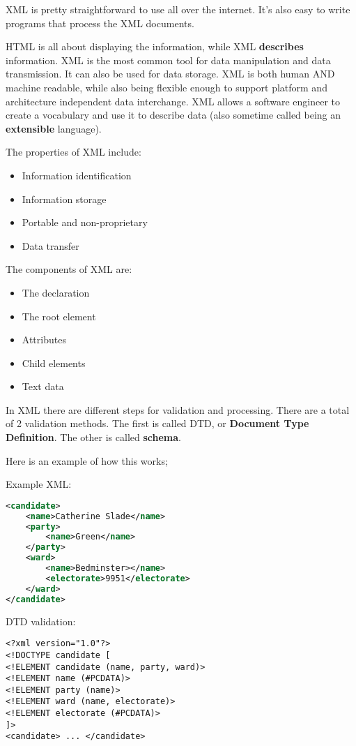 \documentclass[11pt,a4paper,titlepage,dvipsnames,cmyk]{scrartcl}
\begin{document}
XML is pretty straightforward to use all over the internet. It's also easy
to write programs that process the XML documents.

HTML is all about displaying the information, while XML \textbf{describes}
information. XML is the most common tool for data manipulation and data
transmission. It can also be used for data storage. XML is both human AND
machine readable, while also being flexible enough to support platform and
architecture independent data interchange. XML allows a software engineer
to create a vocabulary and use it to describe data (also sometime called
being an \textbf{extensible} language).

The properties of XML include:
\begin{itemize}
    \item Information identification
    \item Information storage
    \item Portable and non-proprietary
    \item Data transfer
\end{itemize}

The components of XML are:

\begin{itemize}
    \item The declaration
    \item The root element
    \item Attributes
    \item Child elements
    \item Text data
\end{itemize}

In XML there are different steps for validation and processing. There are
a total of 2 validation methods. The first is called DTD, or
\textbf{Document Type Definition}. The other is called \textbf{schema}.

Here is an example of how this works;

Example XML:
\begin{lstlisting}[language=XML]
<candidate>
    <name>Catherine Slade</name>
    <party>
        <name>Green</name>
    </party>
    <ward>
        <name>Bedminster></name>
        <electorate>9951</electorate>
    </ward>
</candidate>
\end{lstlisting}

DTD validation:
\begin{lstlisting}[]
<?xml version="1.0"?>
<!DOCTYPE candidate [
<!ELEMENT candidate (name, party, ward)>
<!ELEMENT name (#PCDATA)>
<!ELEMENT party (name)>
<!ELEMENT ward (name, electorate)>
<!ELEMENT electorate (#PCDATA)>
]>
<candidate> ... </candidate>
\end{lstlisting}
\end{document}
